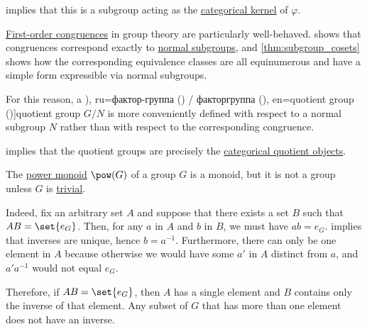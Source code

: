 \begin{definition}
\begin{thmenum}
     implies that this is a subgroup acting as the \hyperref[def:categorical_kernels/kernel]{categorical kernel} of \( \varphi \).

    \mimprovised \hyperref[def:fol_congruence]{First-order congruences} in group theory are particularly well-behaved.  shows that congruences correspond exactly to \hyperref[def:normal_subgroup]{normal subgroups}, and \cref{thm:subgroup_cosets} shows how the corresponding equivalence classes are all equinumerous and have a simple form expressible via normal subgroups.

    For this reason, a \term[bg=фактор-група (\cite[97]{ГеновМиховскиМоллов1991Алгебра}), ru=фактор-группа (\cite[94]{Тыртышников2017ОсновыАлгебры}) / факторгруппа (\cite[33]{Кострикин2020АлгебраЧасть3}), en=quotient group (\cite[def. II.7.11]{Aluffi2009Algebra})]{quotient group} \( G / N \) is more conveniently defined with respect to a normal subgroup \( N \) rather than with respect to the corresponding congruence.

     implies that the quotient groups are precisely the \hyperref[def:categorical_quotient_object]{categorical quotient objects}.
  \end{thmenum}
\end{definition}

\begin{example}\label{ex:power_set_is_not_a_group}
  The \hyperref[ex:def:monoid/power]{power monoid} \( \pow(G) \) of a group \( G \) is a monoid, but it is not a group unless \( G \) is \hyperref[def:group/trivial]{trivial}.

  Indeed, fix an arbitrary set \( A \) and suppose that there exists a set \( B \) such that \( AB = \set{ e_G } \). Then, for any \( a \) in \( A \) and \( b \) in \( B \), we must have \( ab = e_G \).  implies that inverses are unique, hence \( b = a^{-1} \). Furthermore, there can only be one element in \( A \) because otherwise we would have some \( a' \) in \( A \) distinct from \( a \), and \( a' a^{-1} \) would not equal \( e_G \).

  Therefore, if \( AB = \set{ e_G } \), then \( A \) has a single element and \( B \) contains only the inverse of that element. Any subset of \( G \) that has more than one element does not have an inverse.
\end{example}

